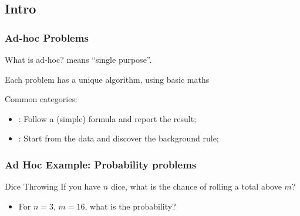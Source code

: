 \documentclass{beamer}
\begin{document}
\subsection{Intro}
\begin{frame}
  \frametitle{Ad-hoc Problems}

  {\small
  \begin{block}{What is ad-hoc?}
     means ``single purpose''.
    
    \bigskip

    Each problem has a unique algorithm, using basic maths
  \end{block}

  \bigskip
  
  Common categories:
  \begin{itemize}
  \item {}: Follow a (simple) formula and report the result;
  \item {}: Start from the data and discover the
    background rule;
  \end{itemize}}
\end{frame}

\begin{frame}
  \frametitle{Ad Hoc Example: Probability problems}

  {\smaller 
    \begin{block}{Dice Throwing}
      If you have $n$ dice, what is the chance of rolling a total above $m$?
    \end{block}

    \begin{itemize}
    \item {} For $n=3$, $m=16$, what is the probability?
    \end{itemize}
  }
\end{frame}
\end{document}
